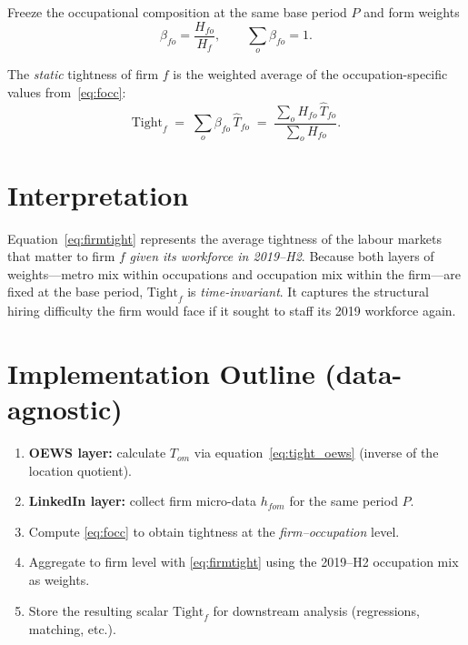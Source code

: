 \documentclass[11pt]{article}
\begin{document}
Freeze the occupational composition at the same base period $P$ and form weights
\begin{equation}
  \beta_{fo}=\frac{H_{fo}}{H_f}, \qquad \sum_o \beta_{fo}=1.
\end{equation}

The \emph{static} tightness of firm $f$ is the weighted average of the occupation-specific values from~\eqref{eq:focc}:
\begin{equation}
  \text{Tight}_f \;=\; \sum_o \beta_{fo}\, \widehat{T}_{fo}
  \;=\; \frac{\displaystyle\sum_o H_{fo}\, \widehat{T}_{fo}}{\displaystyle\sum_o H_{fo}}.
  \label{eq:firmtight}
\end{equation}

\section{Interpretation}

Equation~\eqref{eq:firmtight} represents the average tightness of the labour markets that matter to firm $f$ 
\emph{given its workforce in 2019--H2}.  Because both layers of weights---metro mix within occupations and occupation mix within the firm---are fixed at the base period, $\text{Tight}_f$ is \emph{time-invariant}.  It captures the structural hiring difficulty the firm would face if it sought to staff its 2019 workforce again.

\section{Implementation Outline (data-agnostic)}

\begin{enumerate}
  \item \textbf{OEWS layer:} calculate $T_{om}$ via equation~\eqref{eq:tight_oews} (inverse of the location quotient).
  \item \textbf{LinkedIn layer:} collect firm micro-data $h_{fom}$ for the same period $P$.
  \item Compute \eqref{eq:focc} to obtain tightness at the \emph{firm--occupation} level.
  \item Aggregate to firm level with \eqref{eq:firmtight} using the 2019--H2 occupation mix as weights.
  \item Store the resulting scalar $\text{Tight}_f$ for downstream analysis (regressions, matching, etc.).
\end{enumerate}
\end{document}
